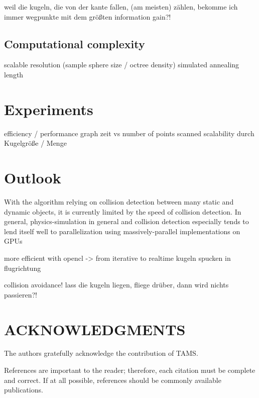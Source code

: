 \documentclass[a4paper, 10pt, conference]{ieeeconf}      %
\begin{document}
weil die kugeln, die von der kante fallen, (am meisten) zählen, bekomme ich immer wegpunkte mit dem größten information gain?!

\subsection{Computational complexity}

scalable resolution (sample sphere size / octree density)
simulated annealing length

\section{Experiments}
efficiency / performance
graph zeit vs number of points scanned
scalability durch Kugelgröße / Menge

\section{Outlook}

With the algorithm relying on collision detection between many static and dynamic objects, it is currently limited by the speed of collision detection. In general, physics-simulation in general and collision detection especially tends to lend itself well to parallelization using massively-parallel implementations on GPUs

more efficient with opencl -> from iterative to realtime
kugeln spucken in flugrichtung

collision avoidance! lass die kugeln liegen, fliege drüber, dann wird nichts passieren?!


\section{ACKNOWLEDGMENTS}

The authors gratefully acknowledge the contribution of TAMS.



References are important to the reader; therefore, each citation must be complete and correct. If at all possible, references should be commonly available publications.
\end{document}
